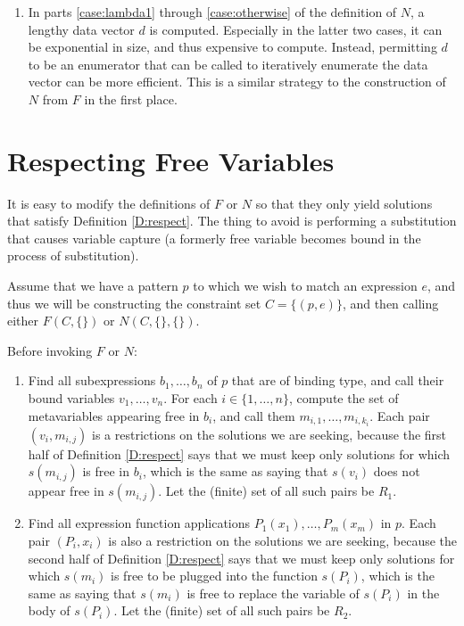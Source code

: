 \documentclass{article}
\begin{document}
\begin{enumerate}
\item	In parts \ref{case:lambda1} through \ref{case:otherwise} of the definition of $N$, a lengthy data vector $d$ is computed.  Especially in the latter two cases, it can be exponential in size, and thus expensive to compute.  Instead, permitting $d$ to be an enumerator that can be called to iteratively enumerate the data vector can be more efficient.  This is a similar strategy to the construction of $N$ from $F$ in the first place.
\end{enumerate}

\section{Respecting Free Variables}\label{S:respect}%

It is easy to modify the definitions of $F$ or $N$ so that they only yield solutions that satisfy Definition \ref{D:respect}.  The thing to avoid is performing a substitution that causes variable capture (a formerly free variable becomes bound in the process of substitution).

Assume that we have a pattern $p$ to which we wish to match an expression $e$, and thus we will be constructing the constraint set $C=\{(p,e)\}$, and then calling either $F(C,\{\})$ or $N(C,\{\},\{\})$.

Before invoking $F$ or $N$:
\begin{enumerate}
\item	Find all subexpressions $b_1,\ldots,b_n$ of $p$ that are of binding type, and call their bound variables $v_1,\ldots,v_n$.  For each $i\in\{1,\ldots,n\}$, compute the set of metavariables appearing free in $b_i$, and call them $m_{i,1},\ldots,m_{i,k_i}$.  Each pair $(v_i,m_{i,j})$ is a restrictions on the solutions we are seeking, because the first half of Definition \ref{D:respect} says that we must keep only solutions for which $s(m_{i,j})$ is free in $b_i$, which is the same as saying that $s(v_i)$ does not appear free in $s(m_{i,j})$.  Let the (finite) set of all such pairs be $R_1$.
\item	Find all expression function applications $P_1(x_1),\ldots,P_m(x_m)$ in $p$.  Each pair $(P_i,x_i)$ is also a restriction on the solutions we are seeking, because the second half of Definition \ref{D:respect} says that we must keep only solutions for which $s(m_i)$ is free to be plugged into the function $s(P_i)$, which is the same as saying that $s(m_i)$ is free to replace the variable of $s(P_i)$ in the body of $s(P_i)$.  Let the (finite) set of all such pairs be $R_2$.
\end{enumerate}
\end{document}
